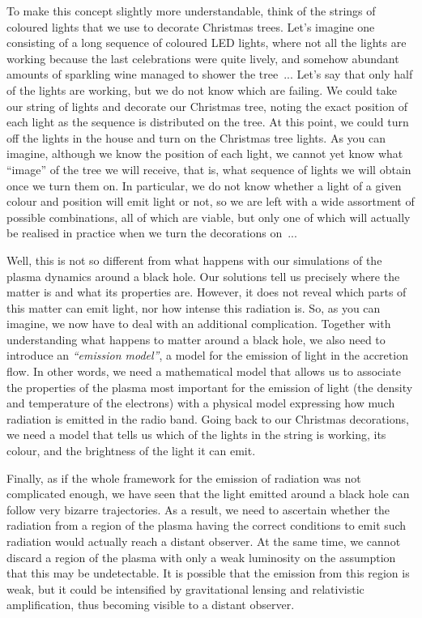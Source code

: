 To make this concept slightly more understandable, think of the strings of coloured
lights that we use to decorate Christmas trees. Let's imagine one consisting of a long
sequence of coloured LED lights, where not all the lights are working because the last
celebrations were quite lively, and somehow abundant amounts of sparkling wine managed
to shower the tree~... Let's say that only half of the lights are working, but we do not
know which are failing. We could take our string of lights and decorate our Christmas
tree, noting the exact position of each light as the sequence is distributed on the
tree. At this point, we could turn off the lights in the house and turn on the Christmas
tree lights. As you can imagine, although we know the position of each light, we cannot
yet know what ``image'' of the tree we will receive, that is, what sequence of lights we
will obtain once we turn them on. In particular, we do not know whether a light of a
given colour and position will emit light or not, so we are left with a wide assortment
of possible combinations, all of which are viable, but only one of which will actually
be realised in practice when we turn the decorations on~...

Well, this is not so different from what happens with our simulations of the plasma
dynamics around a black hole. Our solutions tell us precisely where the matter is and
what its properties are. However, it does not reveal which parts of this matter can emit
light, nor how intense this radiation is. So, as you can imagine, we now have to deal
with an additional complication. Together with understanding what happens to matter
around a black hole, we also need to introduce an \emph{``emission model''}, a model for
the emission of light in the accretion flow. In other words, we need a mathematical
model that allows us to associate the properties of the plasma most important for the
emission of light (the density and temperature of the electrons) with
a physical model expressing how much radiation is emitted in the radio band. Going back
to our Christmas decorations, we need a model that tells us which of the lights in the
string is working, its colour, and the brightness of the light it can emit.

Finally, as if the whole framework for the emission of radiation was not complicated
enough, we have seen that the light emitted around a black hole can follow very bizarre
trajectories. As a result, we need to ascertain whether the radiation from a region of
the plasma having the correct conditions to emit such radiation would
actually reach a distant observer. At the same time, we cannot discard a region of the
plasma with only a weak luminosity on the assumption that this may be undetectable. It
is possible that the emission from this region is weak, but it could be intensified by
gravitational lensing and relativistic amplification, thus becoming
visible to a distant observer.

